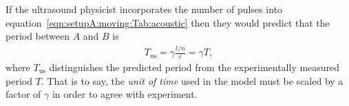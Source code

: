 \documentclass[10pt, fleqn,final,showtrims,oldfontcommands, article,a4paper,oneside]{memoir} %
\newcommand{\eqnref}[1]{\ref{eqn:#1}}
\newcommand{\lr}[1]{\left( #1 \right)}
\newcommand{\us}{{\text{us}}}
\begin{document}
If the ultrasound physicist incorporates the  number of pulses into  equation~\ref{eqn:setupA:moving:Tab:acoustic}
then they would predict that the  period between $A$ and $B$ is
\begin{align}
 T_\us= \gamma \frac{l/n}{c} = \gamma T,
\end{align}
where $T_\us$ distinguishes the predicted period from the experimentally measured period $T$.
That is to say, the {\em  unit of time} used in the model must be scaled  by a factor of $\gamma$ in order to agree with experiment.












\end{document}
